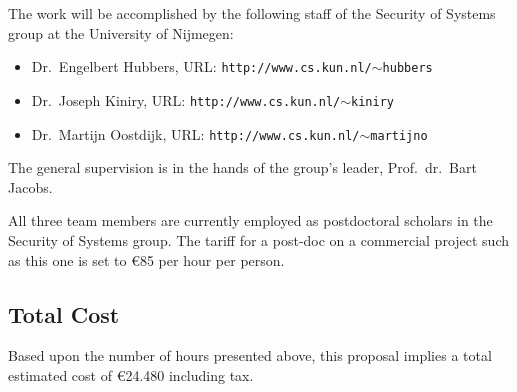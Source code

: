 \documentclass{article}
\newif\ifpdf
\newcommand{\myhref}[2]{\ifpdf\href{#1}{#2}\else\texttt{#2}\fi}
\begin{document}
The work will be accomplished by the following staff of the Security
of Systems group at the University of Nijmegen:
\begin{itemize}
\item Dr.~Engelbert Hubbers, URL: \myhref{http://www.cs.kun.nl/~hubbers/}{http://www.cs.kun.nl/$\sim$hubbers}

\item Dr.~Joseph Kiniry, URL: \myhref{http://www.cs.kun.nl/~kiniry/}{http://www.cs.kun.nl/$\sim$kiniry}

\item Dr.~Martijn Oostdijk, URL: \myhref{http://www.cs.kun.nl/~martijno/}{http://www.cs.kun.nl/$\sim$martijno}
\end{itemize}

\noindent The general supervision is in the hands of the group's
leader, Prof.~dr.~Bart Jacobs.

All three team members are currently employed as postdoctoral scholars
in the Security of Systems group.  The tariff for a post-doc on a
commercial project such as this one is set to \euro{85} per hour per
person.

\subsection{Total Cost}
Based upon the number of hours presented above, this proposal implies a
total estimated cost of \euro{24.480} including tax.



\end{document}
